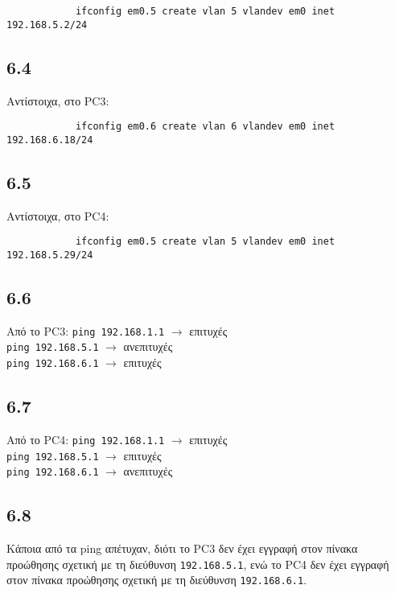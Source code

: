 \documentclass[a4paper, 12pt]{article}
\begin{document}
		\begin{verbatim}
			ifconfig em0.5 create vlan 5 vlandev em0 inet 192.168.5.2/24
		\end{verbatim}

	\subsection*{6.4}
		Αντίστοιχα, στο PC3:
		
		\begin{verbatim}
			ifconfig em0.6 create vlan 6 vlandev em0 inet 192.168.6.18/24
		\end{verbatim}
		
	\subsection*{6.5}
		Αντίστοιχα, στο PC4:
		
		\begin{verbatim}
			ifconfig em0.5 create vlan 5 vlandev em0 inet 192.168.5.29/24
		\end{verbatim}

	\subsection*{6.6}
		Από το PC3:
		\verb|ping 192.168.1.1| $\rightarrow$ επιτυχές \\
		\verb|ping 192.168.5.1| $\rightarrow$ ανεπιτυχές \\
		\verb|ping 192.168.6.1| $\rightarrow$ επιτυχές \\

	\subsection*{6.7}
		Από το PC4:
		\verb|ping 192.168.1.1| $\rightarrow$ επιτυχές \\
		\verb|ping 192.168.5.1| $\rightarrow$ επιτυχές \\
		\verb|ping 192.168.6.1| $\rightarrow$ ανεπιτυχές \\


	\subsection*{6.8} 
		Κάποια από τα ping απέτυχαν, διότι το PC3 δεν έχει εγγραφή στον πίνακα προώθησης σχετική με τη διεύθυνση \verb|192.168.5.1|, ενώ το PC4 δεν έχει εγγραφή στον πίνακα προώθησης σχετική με τη διεύθυνση \verb|192.168.6.1|.
\end{document}
